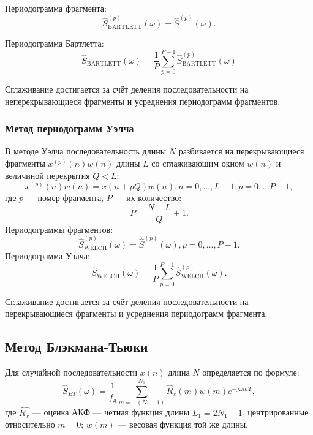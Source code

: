 \documentclass[a4paper, 14pt]{extarticle}
\begin{document}
Периодограмма фрагмента:
\begin{equation}
    \hat{S}^{(p)}_\text{BARTLETT}(\omega) = \hat{S}^{(p)}(\omega).
\end{equation}

Периодограмма Бартлетта:
\begin{equation}
    \hat{S}_\text{BARTLETT}(\omega) = \frac{1}{P} \sum^{P-1}_{p=0} \hat{S}^{(p)}_\text{BARTLETT}(\omega)
\end{equation}

Сглаживание достигается за счёт деления последовательности на неперекрывающиеся фрагменты и усреднения периодограмм фрагментов.

\subsubsection{Метод периодограмм Уэлча}
В методе Уэлча последовательность длины $N$ разбивается  на перекрывающиеся фрагменты $x^{(p)}(n)w(n)$ длины $L$ со сглаживающим окном $w(n)$ и величиной перекрытия $Q < L$:
\begin{equation}
    x^{(p)}(n)w(n) = x (n+pQ)w(n), n = 0, \ldots , L - 1; p = 0, \ldots P - 1,
\end{equation}
где $p$ --- номер фрагмента, $P$ --- их количество:
\begin{equation}
    P = \frac{N-L}{Q} + 1.
\end{equation}
Периодограммы фрагментов:
\begin{equation}
    \hat{S}^{(p)}_\text{WELCH}(\omega) = \hat{S}^{(p)}(\omega), p = 0, \ldots, P -  1.
\end{equation}
Периодограмма Уэлча:
\begin{equation}
    \hat{S}_\text{WELCH}(\omega) = \frac{1}{P} \sum^{P-1}_{p=0} \hat{S}^{(p)}_\text{WELCH} (\omega).
\end{equation}

Сглаживание достигается за счёт деления последовательности на перекрывающиеся фрагменты и усреднения периодограмм фрагмента.

\subsection{Метод Блэкмана-Тьюки}
Для случайной последовательности $x(n)$ длина $N$ определяется по формуле:
\begin{equation}
    \hat{S}_{BT} (\omega) = \frac{1}{f_\text{д}} \sum^{N_1}_{m=-(N_1 - 1)} \hat{R}_x (m) w(m) e^{-j\omega mT},
\end{equation}
где $\hat{R_x}$ --- оценка АКФ --- четная функция длины $L_1 = 2N_1 - 1$, центрированные относительно $m=0$; $w(m)$ --- весовая функция той же длины.
\end{document}
